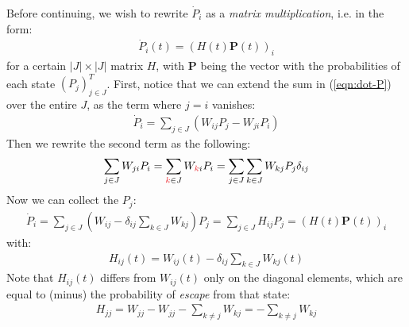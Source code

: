 \documentclass[../template.tex]{subfiles}
\begin{document}
\begin{exo}
    Before continuing, we wish to rewrite $\dot{P}_i$ as a \textit{matrix multiplication}, i.e. in the form:
    \begin{align*}
        \dot{P}_i(t) = (H(t)\bm{P}(t))_i
    \end{align*} 
    for a certain $|J| \times |J|$ matrix $H$, with $\bm{P}$ being the vector with the probabilities of each state $(P_j)^T_{j \in J}$. First, notice that we can extend the sum in (\ref{eqn:dot-P}) over the entire $J$, as the term where $j=i$ vanishes:
    \begin{align*}
        \dot{P}_i = \sum_{j \in J} (W_{ij}P_j - W_{ji} P_i)
    \end{align*}
    Then we rewrite the second term as the following:
    \begin{align*}
        \sum_{j \in J} W_{ji} P_i =  \sum_{\textcolor{Red}{k} \in J} W_{\textcolor{Red}{k}i}P_i = \sum_{j \in J} \sum_{k \in J} W_{kj} P_j \delta_{ij}
    \end{align*}
    Now we can collect the $P_j$:
    \begin{align} \label{eqn:evolution-formula}
        \dot{P}_i = \sum_{j \in J} \left(W_{ij} - \delta_{ij} \sum_{k \in J} W_{kj}\right) P_j = \sum_{j \in J} H_{ij} P_j = (H(t)\bm{P}(t))_i
    \end{align}
    with:
    \begin{align*}
        H_{ij}(t) = W_{ij}(t) - \delta_{ij} \sum_{k \in J} W_{kj}(t)
    \end{align*}
    Note that $H_{ij}(t)$ differs from $W_{ij}(t)$ only on the diagonal elements, which are equal to (minus) the probability of \textit{escape} from that state:
    \begin{align*}
        H_{j j} = W_{j j} - W_{jj} - \sum_{k \neq j} W_{k j} = -\sum_{k \neq j} W_{kj}
    \end{align*} 


\end{exo}
\end{document}
